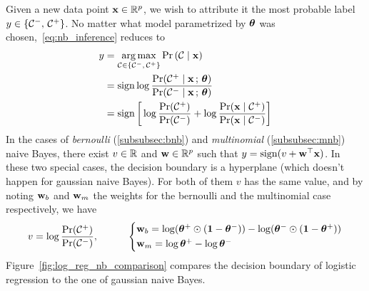 Given a new data point $\mathbf{x} \in \mathbb{R}^p$, we wish to attribute it the most probable label
$y \in \left\{ \mathcal{C}^-,\, \mathcal{C}^+ \right\}$.
No matter what model parametrized by $\bm{\theta}$ was chosen,~\ref{eq:nb_inference} reduces to
\begin{align*}
    y &= \underset{\mathcal{C} \in \left\{ \mathcal{C}^-,\, \mathcal{C}^+ \right\}}{\operatorname*{arg\,max}} \Pr\left( \mathcal{C} \mid \mathbf{x} \right)\\
    &= \operatorname*{sign} \log \frac{\Pr(\mathcal{C}^+ \mid \mathbf{x} \,;\,\bm{\theta})}{\Pr(\mathcal{C}^- \mid \mathbf{x} \,;\,\bm{\theta})}\\
    &= \operatorname*{sign}\bigg[\log \frac{\Pr(\mathcal{C}^+)}{\Pr(\mathcal{C}^-)}
        + \log \frac{\Pr(\mathbf{x} \mid \mathcal{C}^+)}{\Pr(\mathbf{x} \mid \mathcal{C}^-)}\bigg]
\end{align*}
In the cases of \emph{bernoulli} (\ref{subsubsec:bnb}) and \emph{multinomial} (\ref{subsubsec:mnb}) naive Bayes,
there exist $v \in \mathbb{R}$ and $\mathbf{w} \in \mathbb{R}^p$ such that $y = \operatorname*{sign}(v + \mathbf{w}^\top\mathbf{x})$.
In these two special cases, the decision boundary is a hyperplane (which doesn't happen for gaussian naive Bayes).
For both of them $v$ has the same value, and by noting $\mathbf{w}_b$ and $\mathbf{w}_m$ the weights for the bernoulli
and the multinomial case respectively, we have
\begin{equation*}
    v = \log\frac{\Pr(\cC^+)}{\Pr(\cC^-)}
    ,\qquad\quad
    \begin{cases*}
        \ww_b = \log(\btheta^+\odot(\1 - \btheta^-)) - \log(\btheta^-\odot(\1 - \btheta^+))\\
        \ww_m = \log\btheta^+ - \log\btheta^-
    \end{cases*}
\end{equation*}
Figure~\ref{fig:log_reg_nb_comparison} compares the decision boundary of logistic regression to the one
of gaussian naive Bayes.

